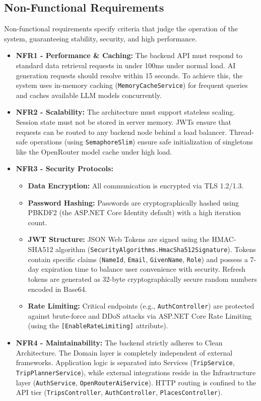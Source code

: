 \subsection{Non-Functional Requirements}
Non-functional requirements specify criteria that judge the operation of the system, guaranteeing stability, security, and high performance.
\begin{itemize}
    \item \textbf{NFR1 - Performance \& Caching:} The backend API must respond to standard data retrieval requests in under 100ms under normal load. AI generation requests should resolve within 15 seconds. To achieve this, the system uses in-memory caching (\texttt{MemoryCacheService}) for frequent queries and caches available LLM models concurrently.
    \item \textbf{NFR2 - Scalability:} The architecture must support stateless scaling. Session state must not be stored in server memory. JWTs ensure that requests can be routed to any backend node behind a load balancer. Thread-safe operations (using \texttt{SemaphoreSlim}) ensure safe initialization of singletons like the OpenRouter model cache under high load.
    \item \textbf{NFR3 - Security Protocols:}
    \begin{itemize}
        \item \textbf{Data Encryption:} All communication is encrypted via TLS 1.2/1.3.
        \item \textbf{Password Hashing:} Passwords are cryptographically hashed using PBKDF2 (the ASP.NET Core Identity default) with a high iteration count.
        \item \textbf{JWT Structure:} JSON Web Tokens are signed using the HMAC-SHA512 algorithm (\texttt{SecurityAlgorithms.HmacSha512Signature}). Tokens contain specific claims (\texttt{NameId}, \texttt{Email}, \texttt{GivenName}, \texttt{Role}) and possess a 7-day expiration time to balance user convenience with security. Refresh tokens are generated as 32-byte cryptographically secure random numbers encoded in Base64.
        \item \textbf{Rate Limiting:} Critical endpoints (e.g., \texttt{AuthController}) are protected against brute-force and DDoS attacks via ASP.NET Core Rate Limiting (using the \texttt{[EnableRateLimiting]} attribute).
    \end{itemize}
    \item \textbf{NFR4 - Maintainability:} The backend strictly adheres to Clean Architecture. The Domain layer is completely independent of external frameworks. Application logic is separated into Services (\texttt{TripService}, \texttt{TripPlannerService}), while external integrations reside in the Infrastructure layer (\texttt{AuthService}, \texttt{OpenRouterAiService}). HTTP routing is confined to the API tier (\texttt{TripsController}, \texttt{AuthController}, \texttt{PlacesController}).
\end{itemize}

